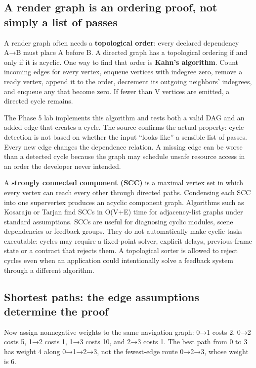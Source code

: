 \subsection{A render graph is an ordering proof, not simply a list of passes}\label{01-foundations-i-ch008-a-render-graph-is-an-ordering-proof-not-simply-a-list-of-passes}

A render graph often needs a \textbf{topological order}: every declared dependency A→B must place A before B. A directed graph has a topological ordering if and only if it is acyclic. One way to find that order is \textbf{Kahn's algorithm}. Count incoming edges for every vertex, enqueue vertices with indegree zero, remove a ready vertex, append it to the order, decrement its outgoing neighbors' indegrees, and enqueue any that become zero. If fewer than V vertices are emitted, a directed cycle remains.

The Phase 5 lab implements this algorithm and tests both a valid DAG and an added edge that creates a cycle. The source confirms the actual property: cycle detection is not based on whether the input ``looks like'' a sensible list of passes. Every new edge changes the dependence relation. A missing edge can be worse than a detected cycle because the graph may schedule unsafe resource access in an order the developer never intended.

A \textbf{strongly connected component (SCC)} is a maximal vertex set in which every vertex can reach every other through directed paths. Condensing each SCC into one supervertex produces an acyclic component graph. Algorithms such as Kosaraju or Tarjan find SCCs in O(V+E) time for adjacency-list graphs under standard assumptions. SCCs are useful for diagnosing cyclic modules, scene dependencies or feedback groups. They do not automatically make cyclic tasks executable: cycles may require a fixed-point solver, explicit delays, previous-frame state or a contract that rejects them. A topological sorter is allowed to reject cycles even when an application could intentionally solve a feedback system through a different algorithm.

\subsection{Shortest paths: the edge assumptions determine the proof}\label{01-foundations-i-ch008-shortest-paths-the-edge-assumptions-determine-the-proof}

Now assign nonnegative weights to the same navigation graph: 0→1 costs 2, 0→2 costs 5, 1→2 costs 1, 1→3 costs 10, and 2→3 costs 1. The best path from 0 to 3 has weight 4 along 0→1→2→3, not the fewest-edge route 0→2→3, whose weight is 6.

